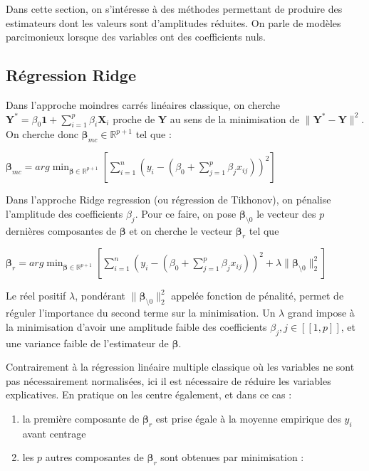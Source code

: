\documentclass[letterpaper,10pt,english]{jupyterBook}
\begin{document}
\sphinxAtStartPar
Dans cette section, on s’intéresse à des méthodes permettant de produire des estimateurs dont les valeurs sont d’amplitudes réduites. On parle de modèles parcimonieux lorsque des variables ont des coefficients nuls.


\subsection{Régression Ridge}
\label{\detokenize{regression:regression-ridge}}
\ignorespaces 
{}\ignorespaces 
\sphinxAtStartPar
Dans l’approche moindres carrés linéaires classique, on cherche \(\mathbf Y^* = \beta_0 \mathbf{1} + \displaystyle\sum_{i=1}^p \beta_i\mathbf X_i\) proche de \(\mathbf Y\) au sens de la minimisation de \(\|\mathbf Y^*-\mathbf Y\|^2 \). On cherche donc \(\boldsymbol\beta_{mc}\in\mathbb{R}^{p+1}\) tel que :

\sphinxAtStartPar
\(\boldsymbol\beta_{mc} = arg\displaystyle\min_{\boldsymbol\beta\in\mathbb{R}^{p+1}}\left [\displaystyle\sum_{i=1}^n \left (y_i-(\beta_0+\displaystyle\sum_{j=1}^p \beta_j x_{ij})\right )^2\right ]\)

\sphinxAtStartPar
Dans l’approche Ridge regression (ou régression de Tikhonov), on pénalise l’amplitude des coefficients \(\beta_j\). Pour ce faire, on pose \(\boldsymbol\beta_{\setminus 0}\) le vecteur des \(p\) dernières composantes de \(\boldsymbol\beta\) et on cherche le vecteur \(\boldsymbol\beta_r\) tel que

\sphinxAtStartPar
\(\boldsymbol\beta_r = arg\displaystyle\min_{\boldsymbol\beta\in\mathbb{R}^{p+1}}\left [\displaystyle\sum_{i=1}^n \left (y_i-(\beta_0+\displaystyle\sum_{j=1}^p \beta_j x_{ij})\right )^2+\lambda \| \boldsymbol\beta_{\setminus 0}\|^2_2\right ]\)

\sphinxAtStartPar
Le réel positif \(\lambda\), pondérant  \(\| \boldsymbol\beta_{\setminus 0}\|^2_2\) appelée fonction de pénalité, permet de réguler l’importance du second terme sur la minimisation. Un \(\lambda\) grand impose à la minimisation d’avoir une amplitude faible des coefficients \(\beta_j,j\in[\![1,p]\!]\), et une variance faible de l’estimateur de \(\boldsymbol\beta\).

\sphinxAtStartPar
Contrairement à la régression linéaire multiple classique où les variables ne sont pas nécessairement normalisées, ici il est nécessaire de réduire les variables explicatives. En pratique on les centre également, et dans ce cas :
\begin{enumerate}
%
\item {} 
\sphinxAtStartPar
la première composante de \(\boldsymbol\beta_r\) est prise égale à la moyenne empirique des \(y_i\) avant centrage

\item {} 
\sphinxAtStartPar
les \(p\) autres composantes de \(\boldsymbol\beta_r\)  sont obtenues par minimisation :

\end{enumerate}
\end{document}
